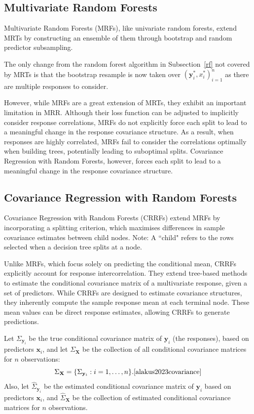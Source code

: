 \documentclass[11pt]{report} %
\begin{document}
\subsection{Multivariate Random Forests}
Multivariate Random Forests (MRFs), like univariate random forests, extend MRTs by constructing an ensemble of them through bootstrap and random predictor subsampling.\cite{segal2011multivariate}

The only change from the random forest algorithm in Subsection~\ref{rf} not covered by MRTs is that the bootstrap resample is now taken over \((\mathbf{y}_i^*, x_i^*)_{i=1}^n\) as there are multiple responses to consider.

However, while MRFs are a great extension of MRTs, they exhibit an important limitation in MRR. Although their loss function can be adjusted to implicitly consider response correlations, MRFs do not explicitly force each split to lead to a meaningful change in the response covariance structure. As a result, when responses are highly correlated, MRFs
fail to consider the correlations optimally when building trees, potentially leading to suboptimal splits.\cite{segal2011multivariate} Covariance Regression with Random Forests, however, forces each split to lead to a meaningful change in the response covariance structure.

\subsection{Covariance Regression with Random Forests}
Covariance Regression with Random Forests (CRRFs) extend MRFs by incorporating a splitting criterion, which maximises differences in sample covariance estimates between child nodes. 
\noindent Note: A ``child" refers to the rows selected when a decision tree splits at a node.

Unlike MRFs, which focus solely on predicting the conditional mean, CRRFs explicitly account for response intercorrelation. They extend tree-based methods to estimate the conditional covariance matrix of a multivariate response, given a set of predictors.\cite{alakus2023covariance} While CRRFs are designed to estimate covariance structures, they inherently compute the sample response mean at each terminal node. These mean values can be direct response estimates, allowing CRRFs to generate predictions.

Let \( \Sigma_{\mathbf{y}_i} \) be the true conditional covariance matrix of \( \mathbf{y}_i \) (the responses), based on predictors \( \mathbf{x}_i \), and let \( \Sigma_{\mathbf{X}} \) be the collection of all conditional covariance matrices for \( n \) observations:
\[
\Sigma_{\mathbf{X}} = \{ \Sigma_{\mathbf{y}_i} : i = 1, \dots, n \}.\cite{alakus2023covariance}
\]
Also, let \( \hat{\Sigma}_{\mathbf{y}_i} \) be the estimated conditional covariance matrix of \( \mathbf{y}_i \) based on predictors \( \mathbf{x}_i \), and \( \hat{\Sigma}_{\mathbf{X}} \) be the collection of estimated conditional covariance matrices for \( n \) observations.\cite{alakus2023covariance}
\end{document}
